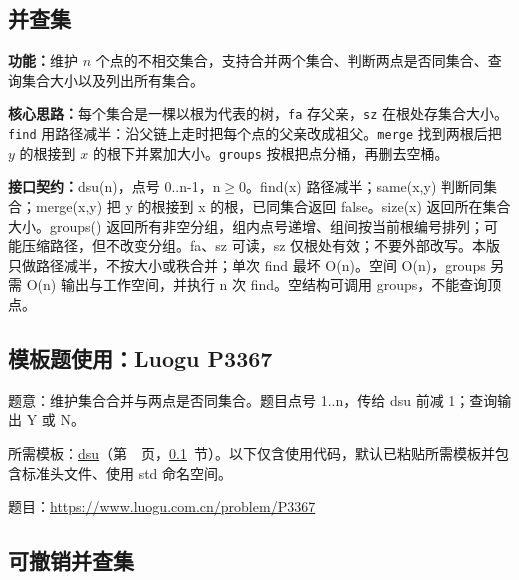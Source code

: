 \subsection{并查集}\label{compact-dsu}

\noindent\textbf{功能：}\allowbreak 维护 $n$ 个点的不相交集合，支持合并两个集合、判断两点是否同集合、查询集合大小以及列出所有集合。

\textbf{核心思路：}\allowbreak 每个集合是一棵以根为代表的树，\texttt{fa} 存父亲，\texttt{sz} 在根处存集合大小。\texttt{find} 用路径减半：沿父链上走时把每个点的父亲改成祖父。\texttt{merge} 找到两根后把 $y$ 的根接到 $x$ 的根下并累加大小。\texttt{groups} 按根把点分桶，再删去空桶。



{\sloppy{}\noindent\textbf{接口契约：}dsu(n)，点号 0..n-1，n$\ge$0。find(x) 路径减半；same(x,y) 判断同集合；merge(x,y) 把 y 的根接到 x 的根，已同集合返回 false。size(x) 返回所在集合大小。groups() 返回所有非空分组，组内点号递增、组间按当前根编号排列；可能压缩路径，但不改变分组。fa、sz 可读，sz 仅根处有效；不要外部改写。本版只做路径减半，不按大小或秩合并；单次 find 最坏 O(n)。空间 O(n)，groups 另需 O(n) 输出与工作空间，并执行 n 次 find。空结构可调用 groups，不能查询顶点。\par}



\Needspace{332pt}

\subsection*{模板题使用：Luogu P3367}

\label{usage-example-7}

题意：维护集合合并与两点是否同集合。题目点号 1..n，传给 dsu 前减 1；查询输出 Y 或 N。

所需模板：\hyperref[compact-dsu]{dsu}（第~\pageref{compact-dsu}~页，\ref{compact-dsu}~节）。以下仅含使用代码，默认已粘贴所需模板并包含标准头文件、使用 std 命名空间。

题目：\url{https://www.luogu.com.cn/problem/P3367}



\Needspace{609pt}

\subsection{可撤销并查集}\label{compact-RollbackDSU}

